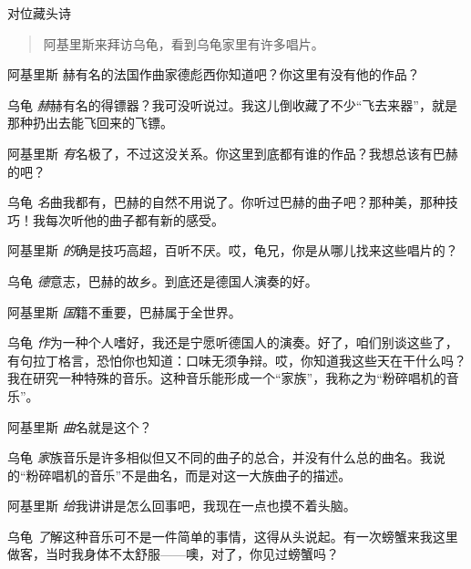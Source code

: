 
\begin{dialog}{对位藏头诗}

\begin{quote}
阿基里斯来拜访乌龟，看到乌龟家里有许多唱片。
\end{quote}

\begin{dialogue}

\item[阿基里斯]\CJKglue 赫有名的法国作曲家德彪西你知道吧？你这里有没有他的作品？

\item[乌龟]\emph{赫}赫有名的得镖器？我可没听说过。我这儿倒收藏了不少“飞去来器”，就是那种扔出去能飞回来的飞镖。

\item[阿基里斯]\emph{有}名极了，不过这没关系。你这里到底都有谁的作品？我想总该有巴赫的吧？

\item[乌龟]\emph{名}曲我都有，巴赫的自然不用说了。你听过巴赫的曲子吧？那种美，那种技巧！我每次听他的曲子都有新的感受。

\item[阿基里斯]\emph{的}确是技巧高超，百听不厌。哎，龟兄，你是从哪儿找来这些唱片的？

\item[乌龟]\emph{德}意志，巴赫的故乡。到底还是德国人演奏的好。

\item[阿基里斯]\emph{国}籍不重要，巴赫属于全世界。

\item[乌龟]\emph{作}为一种个人嗜好，我还是宁愿听德国人的演奏。好了，咱们别谈这些了，有句拉丁格言，恐怕你也知道：口味无须争辩。哎，你知道我这些天在干什么吗？我在研究一种特殊的音乐。这种音乐能形成一个“家族”，我称之为“粉碎唱机的音乐”。

\item[阿基里斯]\emph{曲}名就是这个？

\item[乌龟]\emph{家}族音乐是许多相似但又不同的曲子的总合，并没有什么总的曲名。我说的“粉碎唱机的音乐”不是曲名，而是对这一大族曲子的描述。

\item[阿基里斯]\emph{给}我讲讲是怎么回事吧，我现在一点也摸不着头脑。

\item[乌龟]\emph{了}解这种音乐可不是一件简单的事情，这得从头说起。有一次螃蟹来我这里做客，当时我身体不太舒服——噢，对了，你见过螃蟹吗？


\end{dialogue}
\end{dialog}
